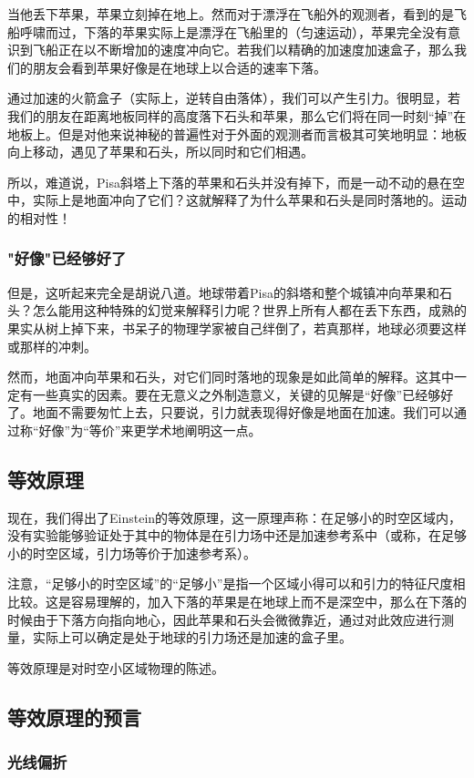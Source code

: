 当他丢下苹果，苹果立刻掉在地上。然而对于漂浮在飞船外的观测者，看到的是飞船呼啸而过，下落的苹果实际上是漂浮在飞船里的（匀速运动），苹果完全没有意识到飞船正在以不断增加的速度冲向它。若我们以精确的加速度加速盒子，那么我们的朋友会看到苹果好像是在地球上以合适的速率下落。

通过加速的火箭盒子（实际上，逆转自由落体），我们可以产生引力。很明显，若我们的朋友在距离地板同样的高度落下石头和苹果，那么它们将在同一时刻“掉”在地板上。但是对他来说神秘的普遍性对于外面的观测者而言极其可笑地明显：地板向上移动，遇见了苹果和石头，所以同时和它们相遇。

所以，难道说，Pisa斜塔上下落的苹果和石头并没有掉下，而是一动不动的悬在空中，实际上是地面冲向了它们？这就解释了为什么苹果和石头是同时落地的。运动的相对性！

\subsubsection{"好像"已经够好了}
但是，这听起来完全是胡说八道。地球带着Pisa的斜塔和整个城镇冲向苹果和石头？怎么能用这种特殊的幻觉来解释引力呢？世界上所有人都在丢下东西，成熟的果实从树上掉下来，书呆子的物理学家被自己绊倒了，若真那样，地球必须要这样或那样的冲刺。

然而，地面冲向苹果和石头，对它们同时落地的现象是如此简单的解释。这其中一定有一些真实的因素。要在无意义之外制造意义，关键的见解是“好像”已经够好了。地面不需要匆忙上去，只要说，引力就表现得好像是地面在加速。我们可以通过称“好像”为“等价”来更学术地阐明这一点。


\subsection{等效原理}
现在，我们得出了Einstein的等效原理，这一原理声称：在足够小的时空区域内，没有实验能够验证处于其中的物体是在引力场中还是加速参考系中（或称，在足够小的时空区域，引力场等价于加速参考系）。

注意，“足够小的时空区域”的“足够小”是指一个区域小得可以和引力的特征尺度相比较。这是容易理解的，加入下落的苹果是在地球上而不是深空中，那么在下落的时候由于下落方向指向地心，因此苹果和石头会微微靠近，通过对此效应进行测量，实际上可以确定是处于地球的引力场还是加速的盒子里。

等效原理是对时空小区域物理的陈述。

\subsection{等效原理的预言}

\subsubsection{光线偏折}




